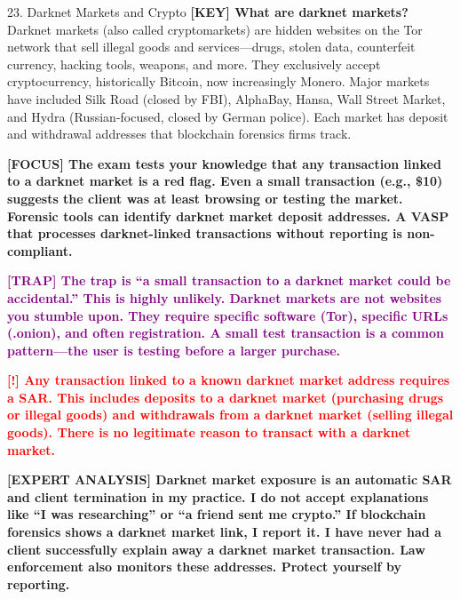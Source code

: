 \documentclass[11pt,a4paper]{beamer}
\newcommand{\redflag}[1]{\textcolor{red}{\textbf{[!] #1}}}
\newcommand{\examfocus}[1]{\textcolor{orange!80!black}{\textbf{[FOCUS] #1}}}
\newcommand{\trap}[1]{\textcolor{purple}{\textbf{[TRAP] #1}}}
\newcommand{\keyterm}[1]{\textcolor{red!80!black}{\textbf{[KEY] #1}}}
\newcommand{\expert}[1]{\textcolor{blue!70!black}{\textbf{[EXPERT ANALYSIS] #1}}}
\begin{document}
	\begin{frame}{23. Darknet Markets and Crypto}
		\tiny
		\keyterm{What are darknet markets?} Darknet markets (also called cryptomarkets) are hidden websites on the Tor network that sell illegal goods and services—drugs, stolen data, counterfeit currency, hacking tools, weapons, and more. They exclusively accept cryptocurrency, historically Bitcoin, now increasingly Monero. Major markets have included Silk Road (closed by FBI), AlphaBay, Hansa, Wall Street Market, and Hydra (Russian-focused, closed by German police). Each market has deposit and withdrawal addresses that blockchain forensics firms track.
		
		\vspace{0.1cm}
		\examfocus{The exam tests your knowledge that any transaction linked to a darknet market is a red flag. Even a small transaction (e.g., \$10) suggests the client was at least browsing or testing the market. Forensic tools can identify darknet market deposit addresses. A VASP that processes darknet-linked transactions without reporting is non-compliant.}
		
		\vspace{0.1cm}
		\trap{The trap is “a small transaction to a darknet market could be accidental.” This is highly unlikely. Darknet markets are not websites you stumble upon. They require specific software (Tor), specific URLs (.onion), and often registration. A small test transaction is a common pattern—the user is testing before a larger purchase.}
		
		\vspace{0.1cm}
		\redflag{Any transaction linked to a known darknet market address requires a SAR. This includes deposits to a darknet market (purchasing drugs or illegal goods) and withdrawals from a darknet market (selling illegal goods). There is no legitimate reason to transact with a darknet market.}
		
		\vspace{0.1cm}
		\expert{Darknet market exposure is an automatic SAR and client termination in my practice. I do not accept explanations like “I was researching” or “a friend sent me crypto.” If blockchain forensics shows a darknet market link, I report it. I have never had a client successfully explain away a darknet market transaction. Law enforcement also monitors these addresses. Protect yourself by reporting.}
	\end{frame}
	
\end{document}
